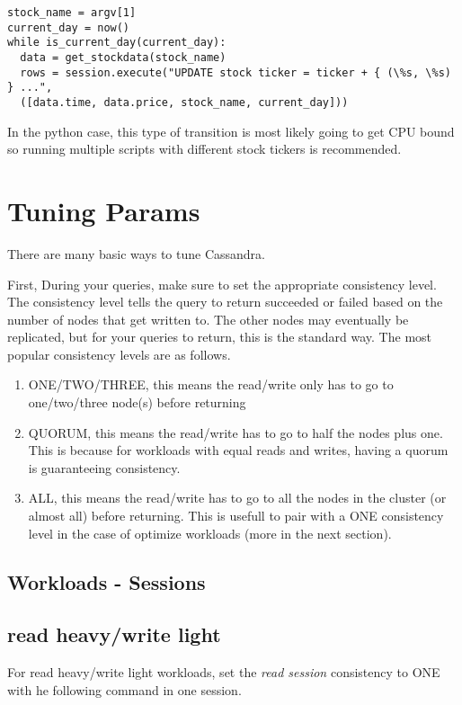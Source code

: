 \documentclass[9pt,twocolumn,twoside]{idsi}
\begin{document}
\begin{lstlisting}[breaklines]
stock_name = argv[1]
current_day = now()
while is_current_day(current_day):
  data = get_stockdata(stock_name)
  rows = session.execute("UPDATE stock ticker = ticker + { (\%s, \%s) } ...", 
  ([data.time, data.price, stock_name, current_day]))
\end{lstlisting}

In the python case, this type of transition is most likely going to get CPU bound so running multiple scripts with different stock tickers is recommended.

\section{Tuning Params}

There are many basic ways to tune Cassandra.

First, During your queries, make sure to set the appropriate consistency level. The consistency level tells the query to return succeeded or failed based on the number of nodes that get written to. The other nodes may eventually be replicated, but for your queries to return, this is the standard way. The most popular consistency levels are as follows.

\begin{enumerate}
\item ONE/TWO/THREE, this means the read/write only has to go to one/two/three node(s) before returning
\item QUORUM, this means the read/write has to go to half the nodes plus one. This is because for workloads with equal reads and writes, having a quorum is guaranteeing consistency.
\item ALL, this means the read/write has to go to all the nodes in the cluster (or almost all) before returning. This is usefull to pair with a ONE consistency level in the case of optimize workloads (more in the next section).
\end{enumerate}

\subsection{Workloads - Sessions}

\subsection{read heavy/write light}

For read heavy/write light workloads, set the \textit{read session} consistency to ONE with he following command in one session.
\end{document}
